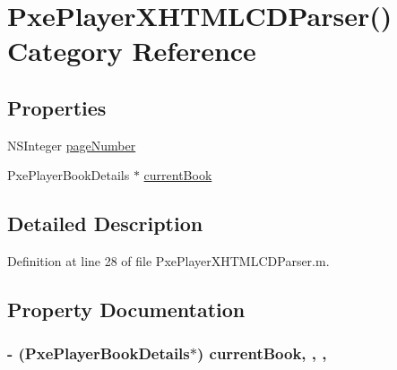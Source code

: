 \hypertarget{category_pxe_player_x_h_t_m_l_c_d_parser_07_08}{\section{Pxe\-Player\-X\-H\-T\-M\-L\-C\-D\-Parser() Category Reference}
\label{category_pxe_player_x_h_t_m_l_c_d_parser_07_08}
}
\subsection*{Properties}
\begin{DoxyCompactItemize}
\item 
N\-S\-Integer \hyperlink{category_pxe_player_x_h_t_m_l_c_d_parser_07_08_a5e9f533018e5f99629b39831cf74e747}{page\-Number}
\item 
Pxe\-Player\-Book\-Details $\ast$ \hyperlink{category_pxe_player_x_h_t_m_l_c_d_parser_07_08_a03f24db4dfa03e10eeabe0f2c75efb6e}{current\-Book}
\end{DoxyCompactItemize}


\subsection{Detailed Description}


Definition at line 28 of file Pxe\-Player\-X\-H\-T\-M\-L\-C\-D\-Parser.\-m.



\subsection{Property Documentation}
\hypertarget{category_pxe_player_x_h_t_m_l_c_d_parser_07_08_a03f24db4dfa03e10eeabe0f2c75efb6e}{
\subsubsection[{current\-Book}]{\setlength{\rightskip}{0pt plus 5cm}-\/ (Pxe\-Player\-Book\-Details$\ast$) current\-Book\hspace{0.3cm}{\ttfamily [read]}, {\ttfamily [write]}, {\ttfamily [nonatomic]}, {\ttfamily [strong]}}}\label{category_pxe_player_x_h_t_m_l_c_d_parser_07_08_a03f24db4dfa03e10eeabe0f2c75efb6e}


